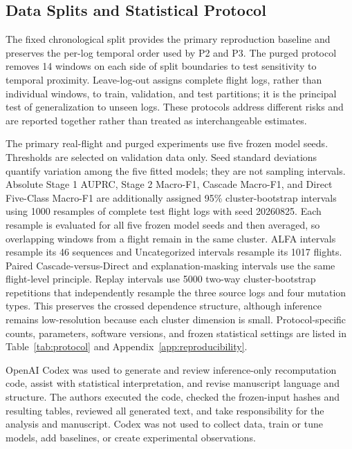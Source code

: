 \subsection{Data Splits and Statistical Protocol}

The fixed chronological split provides the primary reproduction baseline and preserves the per-log temporal order used by P2 and P3. The purged protocol removes 14 windows on each side of split boundaries to test sensitivity to temporal proximity. Leave-log-out assigns complete flight logs, rather than individual windows, to train, validation, and test partitions; it is the principal test of generalization to unseen logs. These protocols address different risks and are reported together rather than treated as interchangeable estimates.

The primary real-flight and purged experiments use five frozen model seeds. Thresholds are selected on validation data only. Seed standard deviations quantify variation among the five fitted models; they are not sampling intervals. Absolute Stage 1 AUPRC, Stage 2 Macro-F1, Cascade Macro-F1, and Direct Five-Class Macro-F1 are additionally assigned 95\% cluster-bootstrap intervals using 1000 resamples of complete test flight logs with seed 20260825. Each resample is evaluated for all five frozen model seeds and then averaged, so overlapping windows from a flight remain in the same cluster. ALFA intervals resample its 46 sequences and Uncategorized intervals resample its 1017 flights. Paired Cascade-versus-Direct and explanation-masking intervals use the same flight-level principle. Replay intervals use 5000 two-way cluster-bootstrap repetitions that independently resample the three source logs and four mutation types. This preserves the crossed dependence structure, although inference remains low-resolution because each cluster dimension is small. Protocol-specific counts, parameters, software versions, and frozen statistical settings are listed in Table~\ref{tab:protocol} and Appendix~\ref{app:reproducibility}.

OpenAI Codex was used to generate and review inference-only recomputation code, assist with statistical interpretation, and revise manuscript language and structure. The authors executed the code, checked the frozen-input hashes and resulting tables, reviewed all generated text, and take responsibility for the analysis and manuscript. Codex was not used to collect data, train or tune models, add baselines, or create experimental observations.
